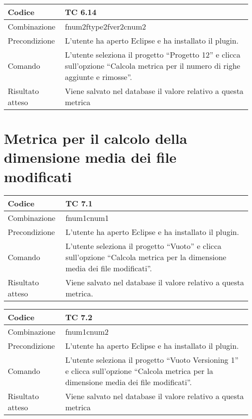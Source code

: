 \begin{table}[ht]
\begin{tabular}{|p{3cm}|p{9cm}|}
\hline
\cellcolor{lightgray}Codice				& TC 6.14								\\
\hline
\cellcolor{lightgray}Combinazione		& fnum2ftype2fver2cnum2								\\
\hline
\cellcolor{lightgray}Precondizione		& L'utente ha aperto Eclipse e ha installato il plugin.			\\
\hline
\cellcolor{lightgray}Comando			& L'utente seleziona il progetto ``Progetto 12''  e clicca sull'opzione ``Calcola metrica per il numero di righe aggiunte e rimosse''.	\\
\hline
\cellcolor{lightgray}Risultato atteso	& Viene salvato nel database il valore relativo a questa metrica	\\
\hline
\end{tabular}
\end{table}

\clearpage

\section{Metrica per il calcolo della dimensione media dei file modificati}

\begin{table}[ht]
\begin{tabular}{|p{3cm}|p{9cm}|}
\hline
\cellcolor{lightgray}Codice				& TC 7.1								\\
\hline
\cellcolor{lightgray}Combinazione		& fnum1cnum1									\\
\hline
\cellcolor{lightgray}Precondizione		& L'utente ha aperto Eclipse e ha installato il plugin.		\\
\hline
\cellcolor{lightgray}Comando			& L'utente seleziona il progetto ``Vuoto''  e clicca sull'opzione ``Calcola metrica per la dimensione media dei file modificati''.	\\
\hline
\cellcolor{lightgray}Risultato atteso	& Viene salvato nel database il valore relativo a questa metrica.\\
\hline
\end{tabular}
\end{table}

\begin{table}[ht]
\begin{tabular}{|p{3cm}|p{9cm}|}
\hline
\cellcolor{lightgray}Codice				& TC 7.2								\\
\hline
\cellcolor{lightgray}Combinazione		& fnum1cnum2 									\\
\hline
\cellcolor{lightgray}Precondizione		& L'utente ha aperto Eclipse e ha installato il plugin.				\\
\hline
\cellcolor{lightgray}Comando			& L'utente seleziona il progetto ``Vuoto Versioning 1''  e clicca sull'opzione ``Calcola metrica per la dimensione media dei file modificati''.	\\
\hline
\cellcolor{lightgray}Risultato atteso	& Viene salvato nel database il valore relativo a questa metrica	\\
\hline
\end{tabular}
\end{table}

